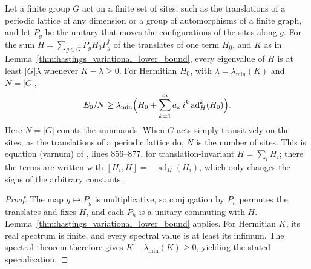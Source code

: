 \begin{lemma}
    \label{thm:hastings_variational_lower_bound_sites}
    \leanok
    Let a finite group $G$ act on a finite set of sites, such as the
    translations of a periodic lattice of any dimension or a group of
    automorphisms of a finite graph, and let $P_g$ be the unitary that moves the
    configurations of the sites along $g$. For the sum
    $H=\sum_{g\in G}P_gH_0P_g^\dagger$ of the translates of one term $H_0$, and
    $K$ as in Lemma~\ref{thm:hastings_variational_lower_bound}, every
    eigenvalue of $H$ is at least $|G|\lambda$ whenever $K-\lambda\ge0$. For
    Hermitian $H_0$, with $\lambda=\lambda_{\min}(K)$ and $N=|G|$,
    \begin{align}
        E_0/N\ge\lambda_{\min}\Bigl(H_0+\sum_{k=1}^ma_k\,i^k
        \operatorname{ad}_H^k(H_0)\Bigr).
    \end{align}
    Here $N=|G|$ counts the summands. When $G$ acts simply transitively on the
    sites, as the translations of a periodic lattice do, $N$ is the number of
    sites. This is equation (varnum) of \cite{Hastings2006Solving}, lines
    856--877, for translation-invariant $H=\sum_iH_i$; there the terms are
    written with $[H_i,H]=-\operatorname{ad}_H(H_i)$, which only changes the
    signs of the arbitrary constants.
\end{lemma}
\begin{proof}\leanok
    The map $g\mapsto P_g$ is multiplicative, so conjugation by $P_h$ permutes
    the translates and fixes $H$, and each $P_h$ is a unitary commuting with $H$.
    Lemma~\ref{thm:hastings_variational_lower_bound} applies. For Hermitian
    $K$, its real spectrum is finite, and every spectral value is at least
    its infimum. The spectral theorem therefore gives
    $K-\lambda_{\min}(K)\ge0$, yielding the stated specialization.
\end{proof}

